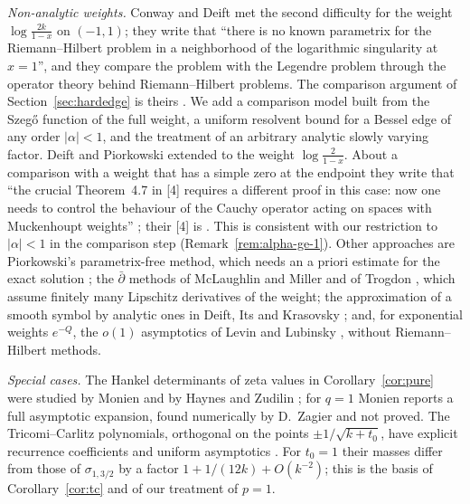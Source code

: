 \emph{Non-analytic weights.} Conway and Deift \cite{CD} met the second difficulty for the weight $\log\frac{2k}{1-x}$ on
$(-1,1)$; they write that ``there is no known parametrix for the Riemann--Hilbert problem in a neighborhood of the
logarithmic singularity at $x=1$'', and they compare the problem with the Legendre problem through the operator theory
behind Riemann--Hilbert problems. The comparison argument of Section~\ref{sec:hardedge} is theirs \cite[Theorem~4.7 and
Proposition~4.9]{CD}. We add a comparison model built from the Szeg\H{o} function of the full weight, a uniform resolvent
bound for a Bessel edge of any order $|\alpha|<1$, and the treatment of an arbitrary analytic slowly varying factor.
Deift and Piorkowski \cite{DP} extended \cite{CD} to the weight $\log\frac{2}{1-x}$. About a comparison with a weight
that has a simple zero at the endpoint they write that ``the crucial Theorem~4.7 in [4] requires a different proof in
this case: now one needs to control the behaviour of the Cauchy operator acting on spaces with Muckenhoupt weights''
\cite[\S1]{DP}; their [4] is \cite{CD}. This is consistent with our restriction to $|\alpha|<1$ in the comparison step
(Remark~\ref{rem:alpha-ge-1}). Other approaches are Piorkowski's parametrix-free method, which needs an a priori
estimate for the exact solution \cite{Pio}; the $\bar\partial$ methods of McLaughlin and Miller \cite{MM} and of
Trogdon \cite{Tro}, which assume finitely many Lipschitz derivatives of the weight; the approximation of a smooth symbol
by analytic ones in Deift, Its and Krasovsky \cite[\S6.2]{DIK}; and, for exponential weights $e^{-Q}$, the $o(1)$
asymptotics of Levin and Lubinsky \cite{LL}, without Riemann--Hilbert methods.

\emph{Special cases.} The Hankel determinants of zeta values in Corollary~\ref{cor:pure} were studied by
Monien \cite{Monien} and by Haynes and Zudilin \cite{HaynesZudilin}; for $q=1$ Monien reports a full asymptotic
expansion, found numerically by D.~Zagier and not proved. The Tricomi--Carlitz polynomials, orthogonal on the points $\pm1/\sqrt{k+t_0}$,
have explicit recurrence coefficients \cite[\S3]{VA} and uniform asymptotics \cite{WLXZ}. For $t_0=1$ their masses differ
from those of $\sigma_{1,3/2}$ by a factor $1+1/(12k)+O(k^{-2})$; this is the basis of Corollary~\ref{cor:tc} and of
our treatment of $p=1$.

